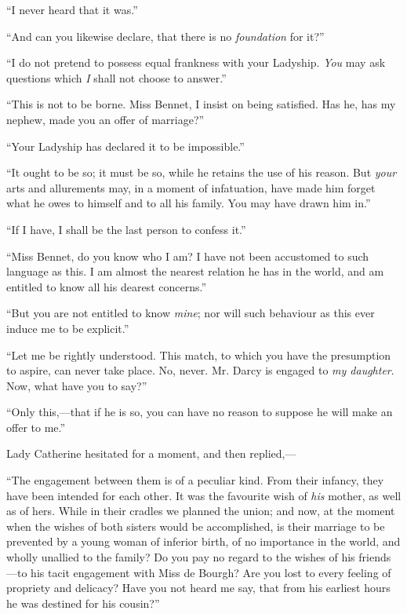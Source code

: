 ``I never heard that it was.''

``And can you likewise declare, that there is no \textit{foundation} for it?''

``I do not pretend to possess equal frankness with your Ladyship. \textit{You} may ask questions which \textit{I} shall not choose to answer.''

``This is not to be borne. Miss Bennet, I insist on being satisfied. Has he, has my nephew, made you an offer of marriage?''

``Your Ladyship has declared it to be impossible.''

``It ought to be so; it must be so, while he retains the use of his reason. But \textit{your} arts and allurements may, in a moment of infatuation, have made him forget what he owes to himself and to all his family. You may have drawn him in.''

``If I have, I shall be the last person to confess it.''

``Miss Bennet, do you know who I am? I have not been accustomed to such language as this. I am almost the nearest relation he has in the world, and am entitled to know all his dearest concerns.''

``But you are not entitled to know \textit{mine}; nor will such behaviour as this ever induce me to be explicit.''

``Let me be rightly understood. This match, to which you have the presumption to aspire, can never take place. No, never. Mr. Darcy is engaged to \textit{my daughter}. Now, what have you to say?''

``Only this,---that if he is so, you can have no reason to suppose he will make an offer to me.''

Lady Catherine hesitated for a moment, and then replied,---

``The engagement between them is of a peculiar kind. From their infancy, they have been intended for each other. It was the favourite wish of \textit{his} mother, as well as of hers. While in their cradles we planned the union; and now, at the moment when the wishes of both sisters would be accomplished, is their marriage to be prevented by a young woman of inferior birth, of no importance in the world, and wholly unallied to the family? Do you pay no regard to the wishes of his friends---to his tacit engagement with Miss de Bourgh? Are you lost to every feeling of propriety and delicacy? Have you not heard me say, that from his earliest hours he was destined for his cousin?''

